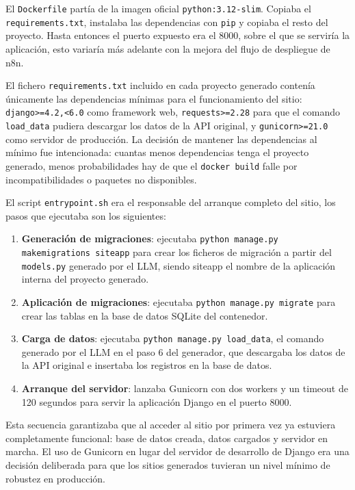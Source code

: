 El \texttt{Dockerfile} partía de la imagen oficial \texttt{python:3.12-slim}. Copiaba el \\ \texttt{requirements.txt}, instalaba las dependencias con \texttt{pip} y copiaba el resto del proyecto. Hasta entonces el puerto expuesto era el 8000, sobre el que se serviría la aplicación, esto variaría más adelante con la mejora del flujo de despliegue de n8n.

El fichero \texttt{requirements.txt} incluido en cada proyecto generado contenía únicamente las dependencias mínimas para el funcionamiento del sitio: \texttt{django>=4.2,<6.0} como framework web, \texttt{requests>=2.28} para que el comando \texttt{load\_data} pudiera descargar los datos de la API original, y \texttt{gunicorn>=21.0} como servidor de producción. La decisión de mantener las dependencias al mínimo fue intencionada: cuantas menos dependencias tenga el proyecto generado, menos probabilidades hay de que el \texttt{docker build} falle por incompatibilidades o paquetes no disponibles.

El script \texttt{entrypoint.sh} era el responsable del arranque completo del sitio, los pasos que ejecutaba son los siguientes:

\begin{enumerate}
    \item \textbf{Generación de migraciones}: ejecutaba \texttt{python manage.py makemigrations siteapp} para crear los ficheros de migración a partir del \texttt{models.py} generado por el LLM, siendo siteapp el nombre de la aplicación interna del proyecto generado.
    \item \textbf{Aplicación de migraciones}: ejecutaba \texttt{python manage.py migrate} para crear las tablas en la base de datos SQLite del contenedor.
    \item \textbf{Carga de datos}: ejecutaba \texttt{python manage.py load\_data}, el comando generado por el LLM en el paso 6 del generador, que descargaba los datos de la API original e insertaba los registros en la base de datos.
    \item \textbf{Arranque del servidor}: lanzaba Gunicorn con dos workers y un timeout de 120 segundos para servir la aplicación Django en el puerto 8000.
\end{enumerate}

Esta secuencia garantizaba que al acceder al sitio por primera vez ya estuviera completamente funcional: base de datos creada, datos cargados y servidor en marcha. El uso de 
Gunicorn en lugar del servidor de desarrollo de Django era una decisión deliberada para que los sitios generados tuvieran un nivel mínimo de robustez en producción.


